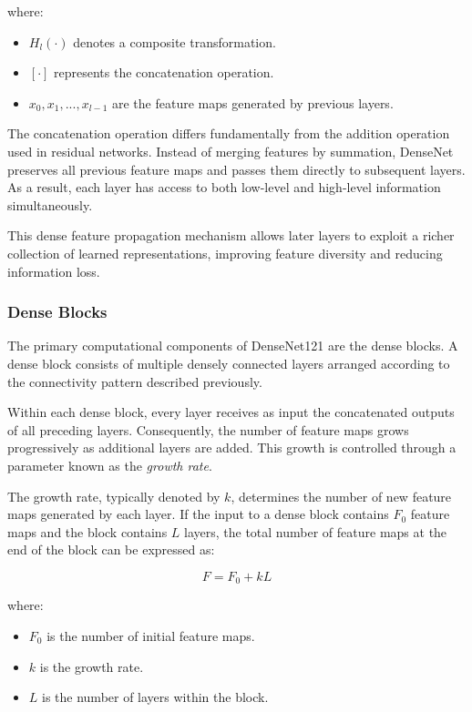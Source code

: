 where:

\begin{itemize}
	\item $H_l(\cdot)$ denotes a composite transformation.
	\item $[\cdot]$ represents the concatenation operation.
	\item $x_0, x_1, ..., x_{l-1}$ are the feature maps generated by previous layers.
\end{itemize}

The concatenation operation differs fundamentally from the addition operation used in residual networks. Instead of merging features by summation, DenseNet preserves all previous feature maps and passes them directly to subsequent layers. As a result, each layer has access to both low-level and high-level information simultaneously.

This dense feature propagation mechanism allows later layers to exploit a richer collection of learned representations, improving feature diversity and reducing information loss.

\subsubsection{Dense Blocks}

The primary computational components of DenseNet121 are the dense blocks. A dense block consists of multiple densely connected layers arranged according to the connectivity pattern described previously.

Within each dense block, every layer receives as input the concatenated outputs of all preceding layers. Consequently, the number of feature maps grows progressively as additional layers are added. This growth is controlled through a parameter known as the \textit{growth rate}.

The growth rate, typically denoted by $k$, determines the number of new feature maps generated by each layer. If the input to a dense block contains $F_0$ feature maps and the block contains $L$ layers, the total number of feature maps at the end of the block can be expressed as:

\begin{equation}
	F = F_0 + kL
\end{equation}

where:

\begin{itemize}
	\item $F_0$ is the number of initial feature maps.
	\item $k$ is the growth rate.
	\item $L$ is the number of layers within the block.
\end{itemize}

